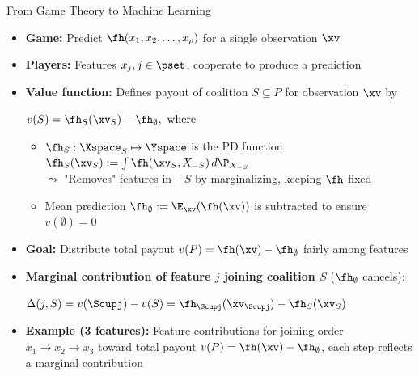 \documentclass[11pt,compress,t,notes=noshow, aspectratio=169, xcolor=table]{beamer}
\begin{document}
\begin{frame}{From Game Theory to Machine Learning}
\begin{itemize}%
    \item \textbf{Game:} Predict $\fh(x_1, x_2, \ldots, x_p)$ for a single observation $\xv$
    \item \textbf{Players:} Features $x_j, j \in \pset$, cooperate to produce a prediction
    \item \textbf{Value function:} Defines payout of coalition $S \subseteq P$ for observation $\xv$ by
    
    \medskip
    \centerline{$v(S) = \fh_{S} (\xv_S) - \fh_{\emptyset} , \text{ where }$}
    \medskip
    
    \begin{itemize}
        \item $ \fh_S: \Xspace_S \mapsto \Yspace$ is the PD function 
  $\fh_S(\xv_S) := \int \fh(\xv_S, X_{-S}) \, d\P_{X_{-S}}$\\
    $\leadsto$ "Removes" features in $-S$ by marginalizing, keeping $\fh$ fixed

    \item Mean prediction $\fh_{ \emptyset} := \E_{\xv}(\fh(\xv))$ is subtracted to ensure $v(\emptyset) = 0$

    \end{itemize}
    
  \item \textbf{Goal:} 
  Distribute total payout $v(P) = \fh(\xv) - \fh_\emptyset$ fairly among features%
  \pause
    \item \textbf{Marginal contribution of feature $j$ joining coalition $S$} ($\fh_{ \emptyset}$ cancels):
    
    \medskip
    \centerline{$\Delta(j, S) = v(\Scupj) - v(S) =  \fh_{\Scupj} (\xv_{\Scupj}) - \fh_{S} (\xv_{S})$}
    \medskip
    
        \item %
         \textbf{Example (3 features):} Feature contributions for joining order $x_1 \rightarrow x_2 \rightarrow x_3$ toward total payout $v(P) = \fh(\xv) - \fh_\emptyset$, each step reflects a marginal contribution
    \resizebox{\linewidth}{!}{
\begin{tikzpicture}[
  dot/.style = {circle, fill, inner sep=2pt},
  arrow/.style = {-stealth, gray, semithick}
]


\end{tikzpicture}}
\end{itemize}
\end{frame}
\end{document}
